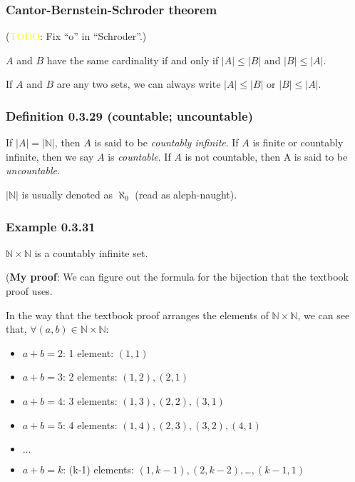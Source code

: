 \documentclass[12pt, letterpaper, oneside]{book}
\begin{document}
\subsubsection{Cantor-Bernstein-Schroder theorem}

(\colorbox{red!100}{\textcolor{yellow}{TODO}}: Fix ``o'' in ``Schroder''.)

$A$ and $B$ have the same cardinality if and only if $|A| \leq |B|$ and $|B|
  \leq |A|$.

If $A$ and $B$ are any two sets, we can always write $|A| \leq |B|$ or $|B|
  \leq |A|$.

\subsubsection{Definition 0.3.29 (countable; uncountable)}

If $|A| = |\mathbb{N}|$, then $A$ is said to be \textit{countably infinite}. If
$A$ is finite or countably infinite, then we say $A$ is \textit{countable}. If
$A$ is not countable, then A is said to be \textit{uncountable}.

$|\mathbb{N}|$ is usually denoted as $\aleph_0$ (read as aleph-naught).

\subsubsection{Example 0.3.31}

$\mathbb{N} \times \mathbb{N}$ is a countably infinite set.

(\colorbox{lime!100}{\textbf{My proof}}: We can figure out the formula for the
bijection that the textbook proof uses.

In the way that the textbook proof arranges the elements of $\mathbb{N} \times
  \mathbb{N}$, we can see that, $\forall (a, b) \in \mathbb{N} \times \mathbb{N}$:
\begin{itemize}
  \item $a + b = 2$: 1 element: $(1, 1)$
  \item $a + b = 3$: 2 elements: $(1, 2), (2, 1)$
  \item $a + b = 4$: 3 elements: $(1, 3), (2, 2), (3, 1)$
  \item $a + b = 5$: 4 elements: $(1, 4), (2, 3), (3, 2), (4, 1)$
  \item $\ldots$
  \item $a + b = k$: (k-1) elements: $(1, k-1), (2, k-2), $\ldots$, (k-1, 1)$
\end{itemize}
\end{document}
